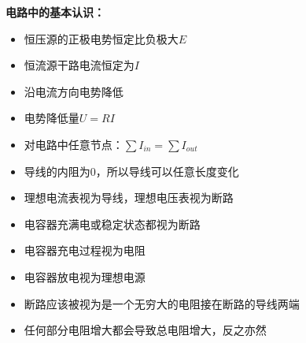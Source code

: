 \noindent\textbf{电路中的基本认识：}
\begin{itemize}
  \item 恒压源的正极电势恒定比负极大$E$
  \item 恒流源干路电流恒定为$I$
  \item 沿电流方向电势降低
  \item 电势降低量$U=RI$
  \item 对电路中任意节点：$\sum I_{in}=\sum I_{out}$
  \item 导线的内阻为0，所以导线可以任意长度变化
  \item 理想电流表视为导线，理想电压表视为断路
  \item 电容器充满电或稳定状态都视为断路
  \item 电容器充电过程视为电阻
  \item 电容器放电视为理想电源
  \item 断路应该被视为是一个无穷大的电阻接在断路的导线两端
  \item 任何部分电阻增大都会导致总电阻增大，反之亦然
\end{itemize}

